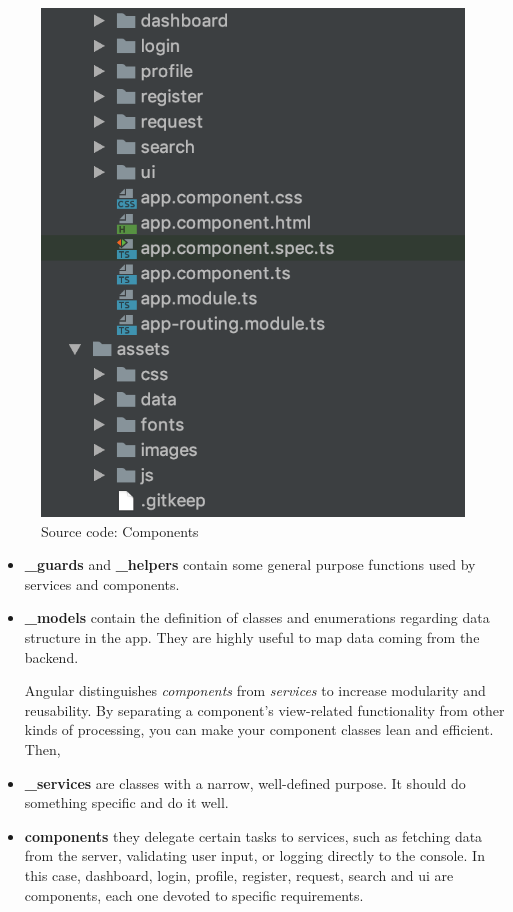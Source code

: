 \documentclass[a4paper, hidelinks, 12pt]{report}
\begin{document}
\begin{itemize}
	\begin{figure}[H]
		\centering
		\includegraphics[scale=0.6]{images/frontend/d4h_source_code_components_assets.png}
		\caption[Source code: Components]{Source code: Components}
		\label{fig:d4h_source_code_components_assets}
	\end{figure}

	\begin{itemize}
			\item \textbf{\_guards} and \textbf{\_helpers} contain some general purpose functions used by services and components.
			\item \textbf{\_models} contain the definition of classes and enumerations regarding data structure in the app. They are highly useful to map data coming from the backend.

			Angular distinguishes \textit{components} from \textit{services} to increase modularity and reusability. By separating a component's view-related functionality from other kinds of processing, you can make your component classes lean and efficient. Then,

			\item \textbf{\_services} are classes with a narrow, well-defined purpose. It should do something specific and do it well.
			\item \textbf{components} they delegate certain tasks to services, such as fetching data from the server, validating user input, or logging directly to the console. In this case, dashboard, login, profile, register, request, search and ui are components, each one devoted to specific requirements.
		\end{itemize}


\end{itemize}
\end{document}

